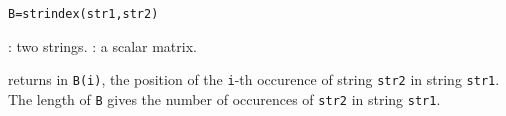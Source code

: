 
\begin{mandesc}
\end{mandesc}
\begin{calling_sequence}
\begin{verbatim}
B=strindex(str1,str2)
\end{verbatim}
\end{calling_sequence}

\begin{parameters}
  \begin{varlist}
     : two strings.
     : a scalar matrix. 
  \end{varlist}
\end{parameters}

\begin{mandescription}
returns in \verb+B(i)+, the position of the \verb+i+-th occurence 
of string \verb+str2+ in string \verb+str1+. The length of \verb+B+ 
gives the number of occurences of \verb+str2+ in string \verb+str1+.
\end{mandescription}

